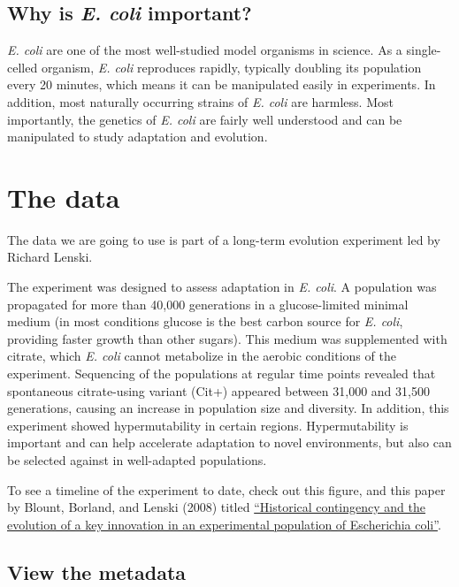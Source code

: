 \documentclass[
  letterpaper,
  DIV=11,
  numbers=noendperiod]{scrreprt}
\begin{document}
\hypertarget{why-is-e.-coli-important}{%
\subsection{\texorpdfstring{Why is \emph{E. coli}
important?}{Why is E. coli important?}}\label{why-is-e.-coli-important}}

\emph{E. coli} are one of the most well-studied model organisms in
science. As a single-celled organism, \emph{E. coli} reproduces rapidly,
typically doubling its population every 20 minutes, which means it can
be manipulated easily in experiments. In addition, most naturally
occurring strains of \emph{E. coli} are harmless. Most importantly, the
genetics of \emph{E. coli} are fairly well understood and can be
manipulated to study adaptation and evolution.

\hypertarget{the-data}{%
\section{The data}\label{the-data}}

The data we are going to use is part of a long-term evolution experiment
led by Richard Lenski.

The experiment was designed to assess adaptation in \emph{E. coli}. A
population was propagated for more than 40,000 generations in a
glucose-limited minimal medium (in most conditions glucose is the best
carbon source for \emph{E. coli}, providing faster growth than other
sugars). This medium was supplemented with citrate, which \emph{E. coli}
cannot metabolize in the aerobic conditions of the experiment.
Sequencing of the populations at regular time points revealed that
spontaneous citrate-using variant (Cit+) appeared between 31,000 and
31,500 generations, causing an increase in population size and
diversity. In addition, this experiment showed hypermutability in
certain regions. Hypermutability is important and can help accelerate
adaptation to novel environments, but also can be selected against in
well-adapted populations.

To see a timeline of the experiment to date, check out this figure, and
this paper by Blount, Borland, and Lenski (2008) titled
\href{https://www.pnas.org/doi/10.1073/pnas.0803151105}{``Historical
contingency and the evolution of a key innovation in an experimental
population of Escherichia coli''}.

\hypertarget{view-the-metadata}{%
\subsection{View the metadata}\label{view-the-metadata}}
\end{document}
